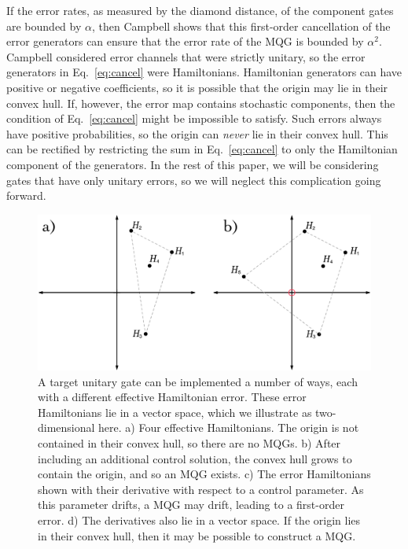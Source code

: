 \documentclass[aps,nofootinbib,pra,notitlepage,twocolumn]{revtex4-1}
\begin{document}
If the error rates, as measured by the diamond distance, of the component gates are bounded by $\alpha$, then Campbell shows that this first-order cancellation of the error generators can ensure that the error rate of the MQG is bounded by $\alpha^2$. Campbell considered error channels that were strictly unitary, so the error generators in Eq.~\eqref{eq:cancel} were Hamiltonians. Hamiltonian generators can have positive or negative coefficients, so it is possible that the origin may lie in their convex hull. If, however, the error map contains stochastic components, then the condition of Eq.~\eqref{eq:cancel} might be impossible to satisfy. Such errors always have positive probabilities, so the origin can \emph{never} lie in their convex hull. This can be rectified by restricting the sum in Eq.~\eqref{eq:cancel} to only the Hamiltonian component of the generators. In the rest of this paper, we will be considering gates that have only unitary errors, so we will neglect this complication going forward. 

\begin{figure}
  \centering
  \includegraphics[width=\columnwidth]{vectorspace.pdf}
  \caption{A target unitary gate can be implemented a number of ways, each with a different effective Hamiltonian error. These error Hamiltonians lie in a vector space, which we illustrate as two-dimensional here. a) Four effective Hamiltonians. The origin is not contained in their convex hull, so there are no MQGs. b) After including an additional control solution, the convex hull grows to contain the origin, and so an MQG exists. c) The error Hamiltonians shown with their derivative with respect to a control parameter. As this parameter drifts, a MQG may drift, leading to a first-order error. d) The derivatives also lie in a vector space. If the origin lies in their convex hull, then it may be possible to construct a MQG.}
  \label{fig:vectorspace}
\end{figure}
\end{document}
